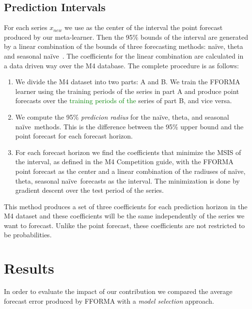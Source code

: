 \documentclass[11pt,a4paper,]{article}
\def\naive{na\"{i}ve}
\theoremstyle{definition}
\theoremstyle{definition}
\theoremstyle{definition}
\theoremstyle{remark}
\begin{document}
\subsection{Prediction Intervals}\label{prediction-intervals}

For each series \(x_{new}\) we use as the center of the interval the
point forecast produced by our meta-learner. Then the 95\% bounds of the
interval are generated by a linear combination of the bounds of three
forecasting methods: \naive, theta and seasonal \naive~. The
coefficients for the linear combination are calculated in a data driven
way over the M4 database. The complete procedure is as follows:

\begin{enumerate}
\def\labelenumi{\arabic{enumi}.}
\item
  We divide the M4 dataset into two parts: A and B. We train the FFORMA
  learner using the training periods of the series in part A and produce
  point forecasts over the \textcolor{green}{training periods of the}
  series of part B, and vice versa.
\item
  We compute the 95\% \emph{predicion radius} for the \naive, theta, and
  seasonal \naive~methods. This is the difference between the 95\% upper
  bound and the point forecast for each forecast horizon.
\item
  For each forecast horizon we find the coefficients that minimize the
  MSIS of the interval, as defined in the M4 Competition guide, with the
  FFORMA point forecast as the center and a linear combination of the
  radiuses of \naive, theta, seasonal \naive~forecasts as the interval.
  The minimization is done by gradient descent over the test period of
  the series.
\end{enumerate}

This method produces a set of three coefficients for each prediction
horizon in the M4 dataset and these coefficients will be the same
independently of the series we want to forecast. Unlike the point
forecast, these coefficients are not restricted to be probabilities.

\section{Results}\label{results}

In order to evaluate the impact of our contribution we compared the
average forecast error produced by FFORMA with a \emph{model selection}
approach.
\end{document}
